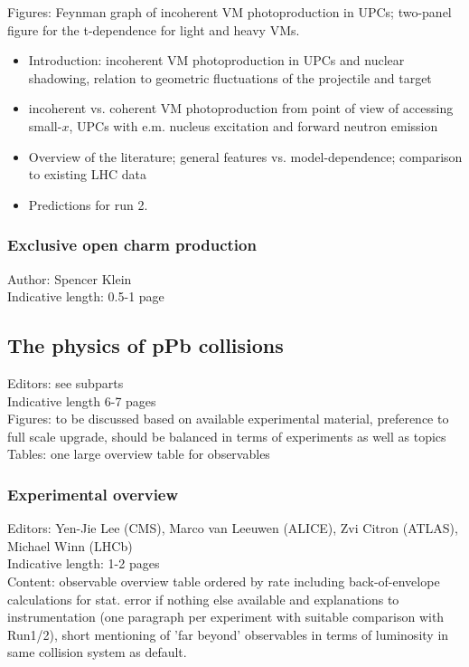 \documentclass[../report.tex]{subfiles}
\begin{document}
Figures: Feynman graph of incoherent VM photoproduction in UPCs; two-panel figure for the t-dependence for light and heavy VMs.
\begin{itemize}
\item Introduction: incoherent VM photoproduction in UPCs and nuclear shadowing, relation to
geometric fluctuations of the projectile and target
\item incoherent vs. coherent VM photoproduction from
point of view of accessing small-$x$, UPCs with e.m. nucleus excitation and forward neutron emission
\item Overview of the literature; general features vs. model-dependence;
comparison to existing LHC data
\item Predictions for run 2.
\end{itemize}

\subsubsection{Exclusive open charm production}
Author: Spencer Klein\\
Indicative length: 0.5-1 page


\subsection{The physics of pPb collisions}
Editors: see subparts\\
Indicative length 6-7 pages\\
Figures: to be discussed based on available experimental material, preference to full scale upgrade, should be balanced in terms of experiments as well as topics\\
Tables: one large overview table for observables
\subsubsection{Experimental overview}
Editors: Yen-Jie Lee (CMS), Marco van Leeuwen (ALICE), Zvi Citron (ATLAS), Michael Winn (LHCb)\\
Indicative length: 1-2 pages\\
Content: observable overview table ordered by rate including back-of-envelope calculations for stat. error if nothing else available and explanations to instrumentation (one paragraph per experiment with suitable comparison with Run1/2), short mentioning of 'far beyond' observables in terms of luminosity in same collision system as default.
\end{document}
